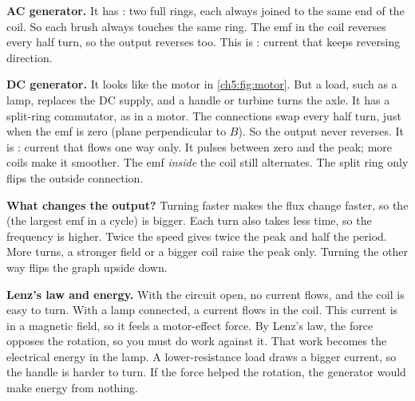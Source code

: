 \textbf{AC generator.} It has : two full rings, each always joined to
the same end of the coil. So each brush always touches the same ring. The emf in the
coil reverses every half turn, so the output reverses too. This is
: current that keeps reversing direction.

\textbf{DC generator.} It looks like the motor in \cref{ch5:fig:motor}. But a load,
such as a lamp, replaces the DC supply, and a handle or turbine turns the axle. It has a
split-ring commutator, as in a motor. The connections
swap every half turn, just when the emf is zero (plane perpendicular to $B$). So the
output never reverses. It is : current that flows one way
only. It pulses between zero and the peak; more coils make it smoother. The emf
\emph{inside} the coil still alternates. The split ring only flips the outside
connection.

\textbf{What changes the output?} Turning faster makes the flux change faster, so the
 (the largest emf in a cycle) is bigger. Each turn also takes less time,
so the frequency is higher. Twice the speed gives twice the peak and half the period.
More turns, a stronger field or a bigger coil raise the peak only. Turning the other
way flips the graph upside down.

\textbf{Lenz's law and energy.} With the circuit open, no current flows, and the coil is
easy to turn. With a lamp connected, a current flows in the coil. This current is in a
magnetic field, so it feels a motor-effect force. By Lenz's law, the force opposes the
rotation, so you must do work against it. That work becomes the electrical energy in
the lamp. A lower-resistance load draws a bigger current, so the handle is harder to
turn. If the force helped the rotation, the generator would make energy from nothing.

